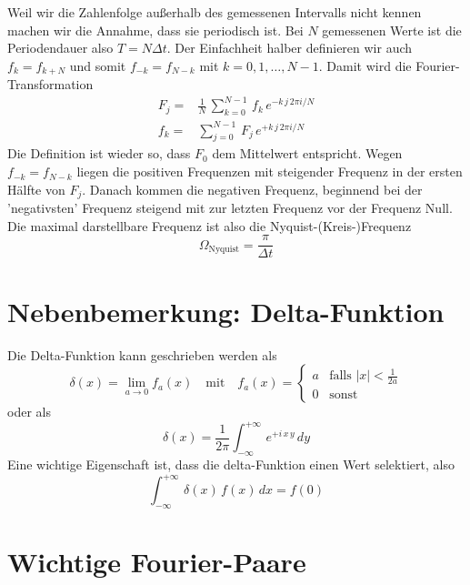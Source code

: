 Weil wir die Zahlenfolge außerhalb des gemessenen Intervalls nicht kennen machen wir die Annahme, dass sie periodisch ist. Bei $N$ gemessenen Werte ist die Periodendauer also $T = N \Delta t$. Der Einfachheit halber definieren wir auch $f_k = f_{k + N}$ und somit $f_{-k} = f_{N - k}$ mit $k= 0, 1, \dots, N-1$. Damit wird die Fourier-Transformation
\begin{align}
 F_j = & \frac{1}{N} \, \sum_{k=0}^{N-1} \, f_k \, e^{- k \, j \, 2 \pi i / N } \\
  f_k = &  \sum_{j=0}^{N-1} \, F_j \, e^{+ k \,  j \, 2 \pi i / N } 
\end{align}
Die Definition ist wieder so, dass $F_0$ dem Mittelwert entspricht. Wegen $f_{-k} = f_{N - k}$ liegen die positiven Frequenzen mit steigender Frequenz in der ersten Hälfte von $F_j$. Danach kommen die negativen Frequenz, beginnend bei der 'negativsten' Frequenz steigend mit zur letzten Frequenz vor der Frequenz Null. Die maximal darstellbare Frequenz ist also die Nyquist-(Kreis-)Frequenz
\begin{equation}
\Omega_\text{Nyquist} = \frac{\pi}{\Delta t}
\end{equation}


\section{Nebenbemerkung: Delta-Funktion}

Die Delta-Funktion kann geschrieben werden als
\begin{equation}
  \delta(x) = \lim_{a \rightarrow 0} f_a(x) \quad
   \text{mit} \quad
    f_a(x) = \left\{ \begin{matrix}
    a  & \text{falls } |x| < \frac{1}{2a} \\
    0 & \text{sonst}
    \end{matrix}
    \right.
\end{equation}
oder als
\begin{equation}
\delta(x)  = \frac{1}{2 \pi}  \int_{-\infty}^{+\infty} \, e^{+ i\, x \, y} \, dy
\end{equation}
Eine wichtige Eigenschaft ist, dass die delta-Funktion einen Wert selektiert, also 
\begin{equation}
 \int_{-\infty}^{+\infty} \, \delta(x) \, f(x) \, dx = f(0)
\end{equation}


\section{Wichtige Fourier-Paare}

